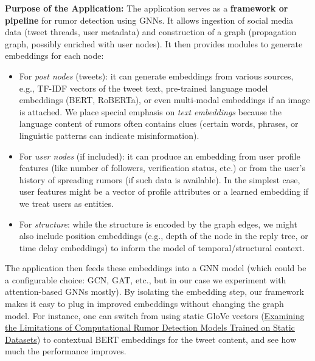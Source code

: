 \documentclass[12pt,a4paper]{report}
\begin{document}
\textbf{Purpose of the Application:} The application serves as a \textbf{framework or pipeline} for rumor detection using GNNs. It allows ingestion of social media data (tweet threads, user metadata) and construction of a graph (propagation graph, possibly enriched with user nodes). It then provides modules to generate embeddings for each node:
\begin{itemize}[leftmargin=1.2cm]
    \item For \textit{post nodes} (tweets): it can generate embeddings from various sources, e.g., TF-IDF vectors of the tweet text, pre-trained language model embeddings (BERT, RoBERTa), or even multi-modal embeddings if an image is attached. We place special emphasis on \textit{text embeddings} because the language content of rumors often contains clues (certain words, phrases, or linguistic patterns can indicate misinformation).
    \item For \textit{user nodes} (if included): it can produce an embedding from user profile features (like number of followers, verification status, etc.) or from the user’s history of spreading rumors (if such data is available). In the simplest case, user features might be a vector of profile attributes or a learned embedding if we treat users as entities.
    \item For \textit{structure}: while the structure is encoded by the graph edges, we might also include position embeddings (e.g., depth of the node in the reply tree, or time delay embeddings) to inform the model of temporal/structural context.
\end{itemize}

The application then feeds these embeddings into a GNN model (which could be a configurable choice: GCN, GAT, etc., but in our case we experiment with attention-based GNNs mostly). By isolating the embedding step, our framework makes it easy to plug in improved embeddings without changing the graph model. For instance, one can switch from using static GloVe vectors (\href{https://arxiv.org/html/2309.11576v2#:~:text=Igata%2C%202012%20%3B%20Yang%20et%C2%A0al,54}{Examining the Limitations of Computational Rumor Detection Models Trained on Static Datasets}) to contextual BERT embeddings for the tweet content, and see how much the performance improves.
\end{document}
